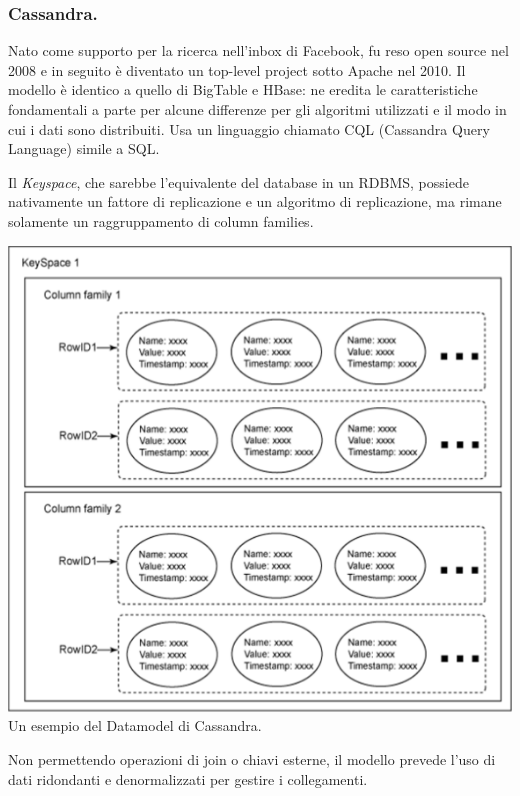 \documentclass[a4page, 11pt]{article}
\begin{document}
\subsubsection*{Cassandra.}
Nato come supporto per la ricerca nell'inbox di Facebook, fu reso open source nel 2008 e in seguito è diventato un top-level project sotto Apache nel 2010.
Il modello è identico a quello di BigTable e HBase: ne eredita le caratteristiche fondamentali a parte per alcune differenze per gli algoritmi utilizzati e il modo in cui i dati sono distribuiti.
Usa un linguaggio chiamato CQL (Cassandra Query Language) simile a SQL.

Il \textit{Keyspace}, che sarebbe l'equivalente del database in un RDBMS, possiede nativamente un fattore di replicazione e un algoritmo di replicazione, ma rimane solamente un raggruppamento di column families.
\begin{center}
	\includegraphics[scale=0.5]{IMAGE5.png} \newline
	Un esempio del Datamodel di Cassandra.
\end{center}

Non permettendo operazioni di join o chiavi esterne, il modello prevede l'uso di dati ridondanti e denormalizzati per gestire i collegamenti.
\end{document}
